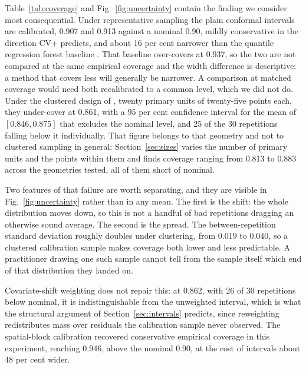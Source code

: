 \documentclass[preprint,12pt,authoryear]{elsarticle}
\begin{document}
Table~\ref{tab:coverage} and Fig.~\ref{fig:uncertainty} contain the finding we
consider most consequential.
Under representative sampling the plain conformal intervals are calibrated,
0.907 and 0.913 against a nominal 0.90, mildly conservative in the direction
CV+ predicts, and about 16 per cent narrower than the quantile regression forest
baseline \citep{meinshausen2006}. That baseline over-covers at 0.937, so the two
are not compared at the same empirical coverage and the width difference is
descriptive: a method that covers less will generally be narrower. A comparison
at matched coverage would need both recalibrated to a common level, which we did
not do. Under the clustered design of \citet{wadoux2021}, twenty primary units
of twenty-five points each, they under-cover at 0.861, with a 95 per cent
confidence interval for the mean of $[0.846, 0.875]$ that excludes the nominal
level, and 25 of the 30 repetitions falling below it individually. That figure
belongs to that geometry and not to clustered sampling in general:
Section~\ref{sec:sizes} varies the number of primary units and the points within
them and finds coverage ranging from 0.813 to 0.883 across the geometries
tested, all of them short of nominal.

Two features of that failure are worth separating, and they are visible in
Fig.~\ref{fig:uncertainty} rather than in any mean. The first is the shift: the
whole distribution moves down, so this is not a handful of bad repetitions
dragging an otherwise sound average. The second is the spread. The
between-repetition standard deviation roughly doubles under clustering, from
$0.019$ to $0.040$, so a clustered calibration sample makes coverage both lower
and less predictable. A practitioner drawing one such sample cannot tell from
the sample itself which end of that distribution they landed on.

Covariate-shift weighting does not repair this: at 0.862, with 26 of 30
repetitions below nominal, it is indistinguishable from the unweighted interval, which is
what the structural argument of Section~\ref{sec:intervals} predicts, since
reweighting redistributes mass over residuals the calibration sample never
observed. The spatial-block calibration recovered conservative empirical
coverage in this experiment, reaching 0.946, above the nominal 0.90, at
the cost of intervals about 48 per cent wider.
\end{document}
